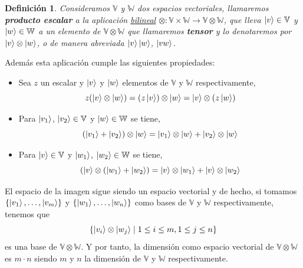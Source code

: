 \documentclass[a4paper]{article}
\newtheorem{deff}{Definición}[section]
\numberwithin{equation}{section}
\begin{document}
\begin{deff}
Consideramos $\mathbb{V}$ y $\mathbb{W}$ dos espacios vectoriales, llamaremos \textbf{producto escalar} a la aplicación \underline{bilineal} $\otimes : \mathbb{V}\times \mathbb{W} \longrightarrow \mathbb{V}\otimes \mathbb{W}$, que lleva $\ket{v} \in \mathbb{V}$ y $\ket{w} \in \mathbb{W}$ a un elemento de $\mathbb{V} \otimes \mathbb{W}$ que llamaremos \textbf{tensor} y lo denotaremos por $\ket{v}\otimes \ket{w}$, o de manera abreviada $\ket{v}\ket{w}$, $\ket{vw}$.
\end{deff}
Además esta aplicación cumple las siguientes propiedades:
\begin{itemize}
\item Sea $z$ un escalar y $\ket{v}$ y $\ket{w}$ elementos de $\mathbb{V}$ y $\mathbb{W}$ respectivamente,
\begin{equation}
z(\ket{v}\otimes\ket{w}) = (z\ket{v})\otimes\ket{w} = \ket{v}\otimes(z\ket{w})
\end{equation}

\item Para $\ket{v_1}$, $\ket{v_2} \in \mathbb{V}$ y $\ket{w} \in \mathbb{W}$ se tiene,
\begin{equation}
(\ket{v_1} + \ket{v_2}) \otimes \ket{w} = \ket{v_1}\otimes\ket{w} + \ket{v_2}\otimes\ket{w}
\end{equation}

\item Para $\ket{v} \in \mathbb{V}$ y $\ket{w_1}$, $\ket{w_2} \in \mathbb{W}$ se tiene,
\begin{equation}
(\ket{v}\otimes (\ket{w_1} +  \ket{w_2}) = \ket{v}\otimes\ket{w_1} + \ket{v}\otimes\ket{w_2}
\end{equation}

\end{itemize}

El espacio de la imagen sigue siendo un espacio vectorial y de hecho, si tomamos $\lbrace \ket{v_1}, \ldots, \ket{v_m} \rbrace$ y $\lbrace \ket{w_1}, \ldots, \ket{w_n} \rbrace$ como bases de $\mathbb{V}$ y $\mathbb{W}$ respectivamente, tenemos que
\begin{equation}
\lbrace \ket{v_i}\otimes\ket{w_j} \mid 1\leq i \leq m, 1\leq j \leq n \rbrace
\end{equation}
es una base de $\mathbb{V}\otimes\mathbb{W}$. Y por tanto, la dimensión como espacio vectorial de $\mathbb{V}\otimes\mathbb{W}$ es $m\cdot n$ siendo $m$ y $n$ la dimensión de $\mathbb{V}$ y $\mathbb{W}$ respectivamente.
\end{document}
